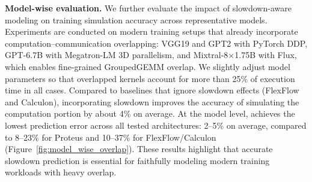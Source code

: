 \noindent\textbf{Model-wise evaluation.} 
We further evaluate the impact of slowdown-aware modeling on training simulation accuracy across representative models. 
Experiments are conducted on modern training setups that already incorporate computation--communication overlapping: VGG19 and GPT2 with PyTorch DDP, GPT-6.7B with Megatron-LM 3D parallelism, and Mixtral-8$\times$1.75B with Flux, which enables fine-grained GroupedGEMM overlap. 
We slightly adjust model parameters so that overlapped kernels account for more than 25\% of execution time in all cases. 
Compared to baselines that ignore slowdown effects (FlexFlow and Calculon), incorporating slowdown improves the accuracy of simulating the computation portion by about 4\% on average. 
At the model level, \sys achieves the lowest prediction error across all tested architectures: 2--5\% on average, compared to 8--23\% for Proteus and 10--37\% for FlexFlow/Calculon (Figure~\ref{fig:model_wise_overlap}). 
These results highlight that accurate slowdown prediction is essential for faithfully modeling modern training workloads with heavy overlap. 
